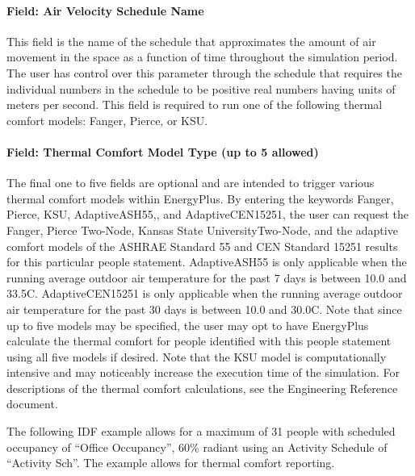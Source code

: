 \paragraph{Field: Air Velocity Schedule Name}\label{field-air-velocity-schedule-name}

This field is the name of the schedule that approximates the amount of air movement in the space as a function of time throughout the simulation period. The user has control over this parameter through the schedule that requires the individual numbers in the schedule to be positive real numbers having units of meters per second. This field is required to run one of the following thermal comfort models: Fanger, Pierce, or KSU. 

\paragraph{Field: Thermal Comfort Model Type (up to 5 allowed)}\label{field-thermal-comfort-model-type-up-to-5-allowed}

The final one to five fields are optional and are intended to trigger various thermal comfort models within EnergyPlus. By entering the keywords Fanger, Pierce, KSU, AdaptiveASH55,, and AdaptiveCEN15251, the user can request the Fanger, Pierce Two-Node, Kansas State UniversityTwo-Node, and the adaptive comfort models of the ASHRAE Standard 55 and CEN Standard 15251 results for this particular people statement. AdaptiveASH55 is only applicable when the running average outdoor air temperature for the past 7 days is between 10.0 and 33.5C. AdaptiveCEN15251 is only applicable when the running average outdoor air temperature for the past 30 days is between 10.0 and 30.0C. Note that since up to five models may be specified, the user may opt to have EnergyPlus calculate the thermal comfort for people identified with this people statement using all five models if desired. Note that the KSU model is computationally intensive and may noticeably increase the execution time of the simulation. For descriptions of the thermal comfort calculations, see the Engineering Reference document.

The following IDF example allows for a maximum of 31 people with scheduled occupancy of ``Office Occupancy'', 60\% radiant using an Activity Schedule of ``Activity Sch''. The example allows for thermal comfort reporting.

